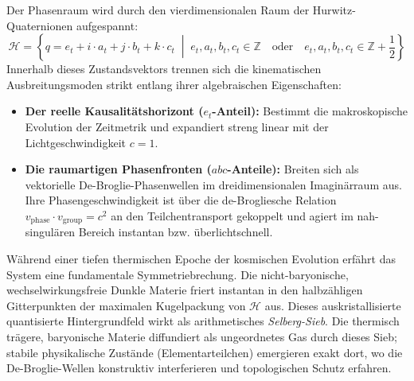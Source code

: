 \documentclass[11pt,a4paper]{article}
\begin{document}
Der Phasenraum wird durch den vierdimensionalen Raum der Hurwitz-Quaternionen aufgespannt:
\begin{equation}
\mathcal{H} = \left\{ q = e_t + i \cdot a_t + j \cdot b_t + k \cdot c_t \;\middle|\; e_t, a_t, b_t, c_t \in \mathbb{Z} \quad \text{oder} \quad e_t, a_t, b_t, c_t \in \mathbb{Z} + \frac{1}{2} \right\}
\end{equation}
Innerhalb dieses Zustandsvektors trennen sich die kinematischen Ausbreitungsmoden strikt entlang ihrer algebraischen Eigenschaften:
\begin{itemize}
    \item \textbf{Der reelle Kausalitätshorizont ($e_t$-Anteil):} Bestimmt die makroskopische Evolution der Zeitmetrik und expandiert streng linear mit der Lichtgeschwindigkeit $c = 1$.
    \item \textbf{Die raumartigen Phasenfronten ($abc$-Anteile):} Breiten sich als vektorielle De-Broglie-Phasenwellen im dreidimensionalen Imaginärraum aus. Ihre Phasengeschwindigkeit ist über die de-Brogliesche Relation $v_{\text{phase}} \cdot v_{\text{group}} = c^2$ an den Teilchentransport gekoppelt und agiert im nah-singulären Bereich instantan bzw. überlichtschnell.
\end{itemize}

Während einer tiefen thermischen Epoche der kosmischen Evolution erfährt das System eine fundamentale Symmetriebrechung. Die nicht-baryonische, wechselwirkungsfreie Dunkle Materie friert instantan in den halbzähligen Gitterpunkten der maximalen Kugelpackung von $\mathcal{H}$ aus. Dieses auskristallisierte quantisierte Hintergrundfeld wirkt als arithmetisches \textit{Selberg-Sieb}. Die thermisch trägere, baryonische Materie diffundiert als ungeordnetes Gas durch dieses Sieb; stabile physikalische Zustände (Elementarteilchen) emergieren exakt dort, wo die De-Broglie-Wellen konstruktiv interferieren und topologischen Schutz erfahren.
\end{document}
